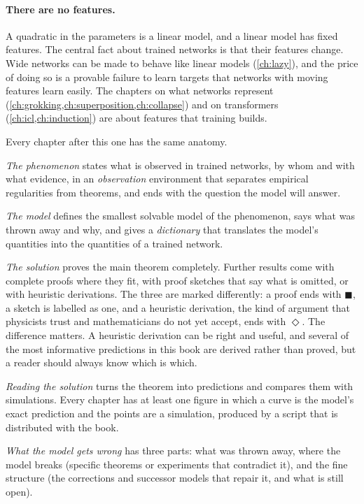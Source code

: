 \begin{refsection}
\paragraph{There are no features.} A quadratic in the parameters is a linear model, and a linear model has fixed features. The central fact about trained networks is that their features change. Wide networks can be made to behave like linear models (\cref{ch:lazy}), and the price of doing so is a provable failure to learn targets that networks with moving features learn easily. The chapters on what networks represent (\cref{ch:grokking,ch:superposition,ch:collapse}) and on transformers (\cref{ch:icl,ch:induction}) are about features that training builds.


Every chapter after this one has the same anatomy.

\emph{The phenomenon} states what is observed in trained networks, by whom and with what evidence, in an \emph{observation} environment that separates empirical regularities from theorems, and ends with the question the model will answer.

\emph{The model} defines the smallest solvable model of the phenomenon, says what was thrown away and why, and gives a \emph{dictionary} that translates the model's quantities into the quantities of a trained network.

\emph{The solution} proves the main theorem completely. Further results come with complete proofs where they fit, with proof sketches that say what is omitted, or with heuristic derivations. The three are marked differently: a proof ends with $\blacksquare$, a sketch is labelled as one, and a heuristic derivation, the kind of argument that physicists trust and mathematicians do not yet accept, ends with $\Diamond$. The difference matters. A heuristic derivation can be right and useful, and several of the most informative predictions in this book are derived rather than proved, but a reader should always know which is which.

\emph{Reading the solution} turns the theorem into predictions and compares them with simulations. Every chapter has at least one figure in which a curve is the model's exact prediction and the points are a simulation, produced by a script that is distributed with the book.

\emph{What the model gets wrong} has three parts: what was thrown away, where the model breaks (specific theorems or experiments that contradict it), and the fine structure (the corrections and successor models that repair it, and what is still open).


\end{refsection}
